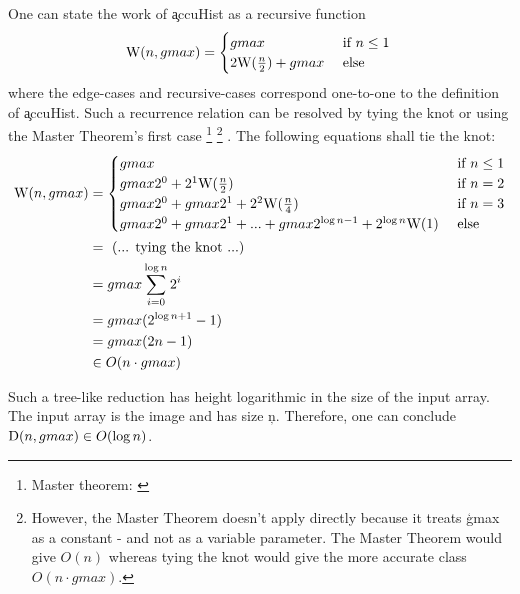     One can state the work of \c{accuHist} as a recursive function
    \begin{equation*}
    \textrm{W}(n,gmax) = \begin{cases}
                 gmax & \text{ if } n \le 1 \\ 
                 2 \textrm{W}(\frac{n}{2}) + gmax & \text{ else }
                \end{cases} \\
    \end{equation*}
    where the edge-cases and recursive-cases correspond one-to-one
    to the definition of \c{accuHist}.
    Such a recurrence relation can be resolved by tying the knot
    or using the Master Theorem's first case
    \footnote{Master theorem: \cite{Cormen2001}}
    \footnote{However, the Master Theorem doesn't apply directly
    because it treats \c{gmax} as a constant -
    and not as a variable parameter.
    The Master Theorem would give $O(n)$ whereas tying the knot
    would give the more accurate class $O(n \cdot gmax)$.}
    .
    The following equations shall tie the knot:
    \begin{equation*}
    \begin{split}
    \textrm{W}(n,gmax)
      & = \begin{cases}
            gmax & \text{ if } n \le 1 \\ 
            gmax2^0 + 2^1\textrm{W}(\frac{n}{2}) & \text{ if } n = 2 \\
            gmax2^0 + gmax2^1 + 2^2\textrm{W}(\frac{n}{4}) & \text{ if } n = 3 \\
            gmax2^0 + gmax2^1 + ... + gmax 2^{\log n - 1} + 2^{\log n}\textrm{W}(1) & \text{ else }
          \end{cases} \\
      & = \textrm{ (... tying the knot ...) } \\
      & = gmax \sum_{i=0}^{\log n}{2^i} \\
      & = gmax (2^{\log n + 1} - 1) \\
      & = gmax (2n - 1) \\
      & \in O(n \cdot gmax) \\
    \end{split}
    \end{equation*}
    
    Such a tree-like reduction has height logarithmic
    in the size of the input array. The input array is the image and
    has size \c{n}. Therefore, one can conclude
    $\textrm{D}(n, gmax) \in O(\log n)$.
  

